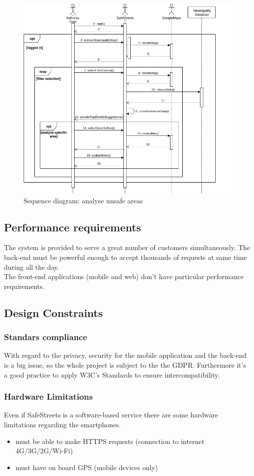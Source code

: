 \documentclass{article}
\begin{document}
\begin{figure}[H]
    \centering
    \includegraphics[scale=0.47]{Images/SequenceThirdPartyUnsafeAreas} 
    \caption{Sequence diagram: analyse unsafe areas}
\end{figure}

\newpage
\subsection{Performance requirements}
The system is provided to serve a great number of customers simultaneously. The
back-end must be powerful enough to accept thousands of requests at same time
during all the day.\\
The front-end applications (mobile and web) don't have particular performance
requirements.
\subsection{Design Constraints}
\subsubsection{Standars compliance}
With regard to the privacy, security for the mobile application and the back-end
is a big issue, so the whole project is subject to the the GDPR. Furthermore
it's a good practice to apply W3C's Standards to ensure intercompatibility.
\subsubsection{Hardware Limitations}
Even if SafeStreets is a software-based service there are some hardware
limitations regarding the smartphones.
\begin{itemize}
    \item must be able to make HTTPS requests (connection to internet
    4G/3G/2G/Wi-Fi)
    \item must have on board GPS (mobile devices only)
\end{itemize}
\end{document}
